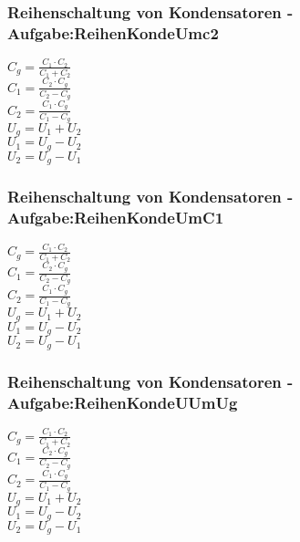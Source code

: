 \subsubsection{Reihenschaltung von Kondensatoren - Aufgabe:ReihenKondeUmc2} 
\begin{minipage}{0.45\textwidth} 
$ C_{g}  = \frac{C_{1} \cdot C_{2} }{C_{1} +C_{2} } $\\ 
$ C_{1}  = \frac{C_{2} \cdot C_{g} }{C_{2} -C_{g} } $\\ 
$ C_{2}  = \frac{C_{1} \cdot C_{g} }{C_{1} -C_{g} } $\\ 
$ U_{g}  = U_{1}  + U_{2} $\\ 
$ U_{1}  = U_{g}  - U_{2} $\\ 
$ U_{2}  = U_{g}  - U_{1} $\\ 
\end{minipage} 
\begin{minipage}{0.45\textwidth} 
 
\end{minipage} 
\subsubsection{Reihenschaltung von Kondensatoren - Aufgabe:ReihenKondeUmC1} 
\begin{minipage}{0.45\textwidth} 
$ C_{g}  = \frac{C_{1} \cdot C_{2} }{C_{1} +C_{2} } $\\ 
$ C_{1}  = \frac{C_{2} \cdot C_{g} }{C_{2} -C_{g} } $\\ 
$ C_{2}  = \frac{C_{1} \cdot C_{g} }{C_{1} -C_{g} } $\\ 
$ U_{g}  = U_{1}  + U_{2} $\\ 
$ U_{1}  = U_{g}  - U_{2} $\\ 
$ U_{2}  = U_{g}  - U_{1} $\\ 
\end{minipage} 
\begin{minipage}{0.45\textwidth} 
 
\end{minipage} 
\subsubsection{Reihenschaltung von Kondensatoren - Aufgabe:ReihenKondeUUmUg} 
\begin{minipage}{0.45\textwidth} 
$ C_{g}  = \frac{C_{1} \cdot C_{2} }{C_{1} +C_{2} } $\\ 
$ C_{1}  = \frac{C_{2} \cdot C_{g} }{C_{2} -C_{g} } $\\ 
$ C_{2}  = \frac{C_{1} \cdot C_{g} }{C_{1} -C_{g} } $\\ 
$ U_{g}  = U_{1}  + U_{2} $\\ 
$ U_{1}  = U_{g}  - U_{2} $\\ 
$ U_{2}  = U_{g}  - U_{1} $\\ 
\end{minipage} 
\begin{minipage}{0.45\textwidth} 
 
\end{minipage} 
